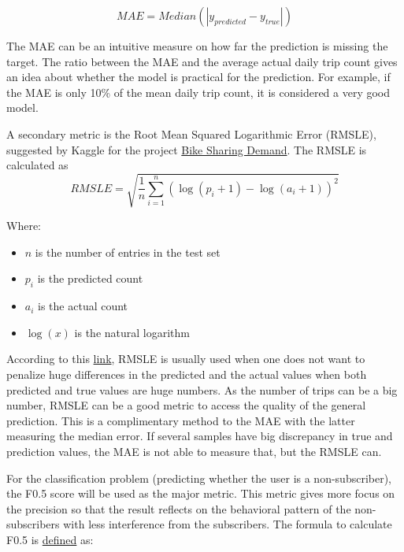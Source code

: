 \documentclass[a4paper]{article}
\begin{document}
		\begin{equation}
		MAE = Median(|y_{predicted} - y_{true}|)
		\end{equation}
		
		The MAE can be an intuitive measure on how far the prediction is missing the target. The ratio between the MAE and the average actual daily trip count gives an idea about whether the model is practical for the prediction. For example, if the MAE is only 10\% of the mean daily trip count, it is considered a very good model.		
		
		A secondary metric is the Root Mean Squared Logarithmic Error (RMSLE), suggested by Kaggle for the project \href{(https://www.kaggle.com/c/bike-sharing-demand#evaluation)}{Bike Sharing Demand}. The RMSLE is calculated as 
		\begin{equation}
		RMSLE = \sqrt{\frac{1}{n}\sum_{i=1}^{n}(\log(p_i + 1) - \log(a_i + 1))^2}
		\end{equation}
		
		Where:
		\begin{itemize}
			\item $n$ is the number of entries in the test set
			\item $p_i$ is the predicted count
			\item $a_i$ is the actual count
			\item $\log(x)$ is the natural logarithm
		\end{itemize}
		
		According to this \href{https://www.quora.com/What-is-the-difference-between-an-RMSE-and-RMSLE-logarithmic-error-and-does-a-high-RMSE-imply-low-RMSLE}{link}, RMSLE is usually used when one does not want to penalize huge differences in the predicted and the actual values when both predicted and true values are huge numbers. As the number of trips can be a big number, RMSLE can be a good metric to access the quality of the general prediction. This is a complimentary method to the MAE with the latter measuring the median error. If several samples have big discrepancy in true and prediction values, the MAE is not able to measure that, but the RMSLE can.
		
		For the classification problem (predicting whether the user is a non-subscriber), the F0.5 score will be used as the major metric. This metric gives more focus on the precision so that the result reflects on the behavioral pattern of the non-subscribers with less interference from the subscribers. The formula to calculate F0.5 is \href{)https://en.wikipedia.org/wiki/F1_score}{defined} as:
		
\end{document}
